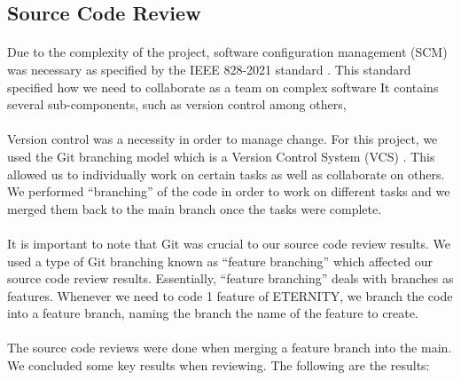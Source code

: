     \subsection{Source Code Review}
        \paragraph{}
        Due to the complexity of the project, software configuration management (SCM) was necessary as specified by the IEEE 828-2021 standard \cite{ieee}. This standard specified how we need to collaborate as a team on complex software It contains several sub-components, such as version control among others,

        \paragraph{}
        Version control  was a necessity in order to manage change. For this project, we used the Git branching model which is a Version Control System (VCS) . This allowed us to individually work on certain tasks as well as collaborate on others. We performed “branching” of the code in order to work on different tasks and we merged them back to the main branch once the tasks were complete.

        \paragraph{}
        It is important to note that Git was crucial to our source code review results. We used a type of Git branching known as “feature branching” which affected our source code review results. Essentially, “feature branching” deals with branches as features. Whenever we need to code 1 feature of ETERNITY, we branch the code into a feature branch, naming the branch the name of the feature to create.

        \paragraph{}
        The source code reviews were done when merging a feature branch into the main. We concluded some key results when reviewing. The following are the results:

